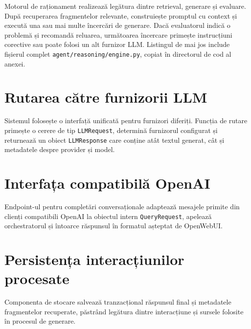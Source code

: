 \documentclass[12pt, a4paper, oneside, romanian]{teza-upb}
\begin{document}
Motorul de raționament realizează legătura dintre retrieval, generare și evaluare. După recuperarea fragmentelor relevante, construiește promptul cu context și execută una sau mai multe încercări de generare. Dacă evaluatorul indică o problemă și recomandă reluarea, următoarea încercare primește instrucțiuni corective sau poate folosi un alt furnizor LLM. Listingul de mai jos include fișierul complet \texttt{agent/reasoning/engine.py}, copiat în directorul de cod al anexei.

\label{anexa:reasoning-engine}


\section{Rutarea către furnizorii LLM}

Sistemul folosește o interfață unificată pentru furnizori diferiți. Funcția de rutare primește o cerere de tip \texttt{LLMRequest}, determină furnizorul configurat și returnează un obiect \texttt{LLMResponse} care conține atât textul generat, cât și metadatele despre provider și model.

\label{anexa:llm-routing}


\section{Interfața compatibilă OpenAI}

Endpoint-ul pentru completări conversaționale adaptează mesajele primite din clienți compatibili OpenAI la obiectul intern \texttt{QueryRequest}, apelează orchestratorul și întoarce răspunsul în formatul așteptat de OpenWebUI.

\label{anexa:openai-compatible-endpoint}


\section{Persistența interacțiunilor procesate}

Componenta de stocare salvează tranzacțional răspunsul final și metadatele fragmentelor recuperate, păstrând legătura dintre interacțiune și sursele folosite în procesul de generare.

\label{anexa:sqlite-interaction-store}

\end{document}
